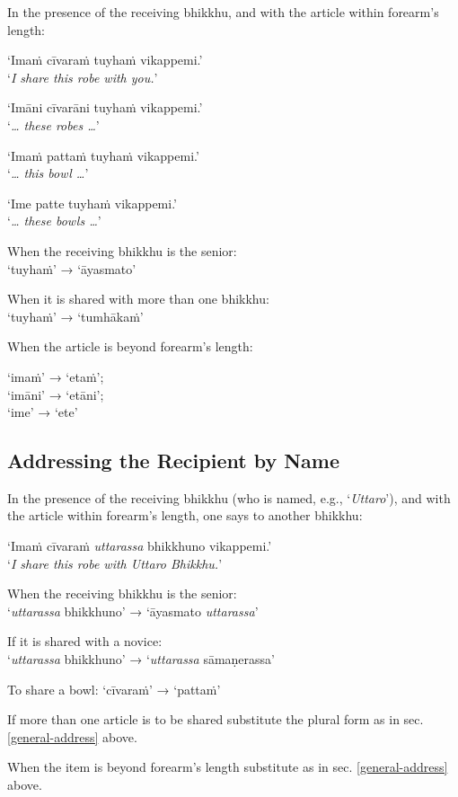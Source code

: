 In the presence of the receiving bhikkhu, and with the article within forearm's length:

‘Imaṁ cīvaraṁ tuyhaṁ vikappemi.’\\
‘\emph{I share this robe with you.}’

‘Imāni cīvarāni tuyhaṁ vikappemi.’\\
‘\emph{\ldots{} these robes \ldots{}}’

‘Imaṁ pattaṁ tuyhaṁ vikappemi.’\\
‘\emph{\ldots{} this bowl \ldots{}}’

‘Ime patte tuyhaṁ vikappemi.’\\
‘\emph{\ldots{} these bowls \ldots{}}’

When the receiving bhikkhu is the senior:\\
‘tuyhaṁ’ → ‘āyasmato’

When it is shared with more than one bhikkhu:\\
‘tuyhaṁ’ → ‘tumhākaṁ’

When the article is beyond forearm's length:

‘imaṁ’ → ‘etaṁ’;\\
‘imāni’ → ‘etāni’;\\
‘ime’ → ‘ete’ 

\subsection{Addressing the Recipient by Name}

In the presence of the receiving bhikkhu (who is named, e.g., ‘\emph{Uttaro}’),
and with the article within forearm's length, one says to another bhikkhu:

‘Imaṁ cīvaraṁ \emph{uttarassa} bhikkhuno vikappemi.’\\
‘\emph{I share this robe with Uttaro Bhikkhu.}’

When the receiving bhikkhu is the senior:\\
‘\emph{uttarassa} bhikkhuno’ → ‘āyasmato \emph{uttarassa}’

If it is shared with a novice:\\
‘\emph{uttarassa} bhikkhuno’ → ‘\emph{uttarassa} sāmaṇerassa’

To share a bowl: ‘cīvaraṁ’ → ‘pattaṁ’

If more than one article is to be shared substitute the plural form as in sec. \ref{general-address} above.

When the item is beyond forearm's length substitute as in sec. \ref{general-address} above.

